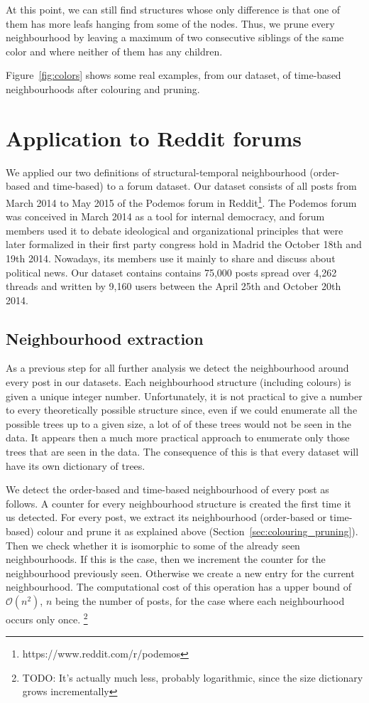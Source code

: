 \documentclass[conference]{IEEEtran}
\begin{document}
At this point, we can still find structures whose only difference is that one of them has more leafs hanging from some of the nodes. Thus, we prune every neighbourhood by leaving a maximum of two consecutive siblings of the same color and where neither of them has any children.

Figure~\ref{fig:colors} shows some real examples, from our dataset, of time-based neighbourhoods after colouring and pruning.

\section{Application to Reddit forums}
We applied our two definitions of structural-temporal neighbourhood (order-based and time-based) to a forum dataset. Our dataset consists of all posts from March 2014 to May 2015 of the Podemos forum in Reddit\footnote{https://www.reddit.com/r/podemos}. The Podemos forum was conceived in March 2014 as a tool for internal democracy, and forum members used it to debate ideological and organizational principles that were later formalized in their first party congress hold in Madrid the October 18th and 19th 2014. Nowadays, its members use it mainly to share and discuss about political news.
Our dataset contains contains 75,000 posts spread over 4,262 threads and written by 9,160 users between the April 25th and October 20th 2014.
\subsection{Neighbourhood extraction}
As a previous step for all further analysis we detect the neighbourhood around every post in our datasets. Each neighbourhood structure (including colours) is given a unique integer number. Unfortunately, it is not practical to give a number to every theoretically possible structure since, even if we could enumerate all the possible trees up to a given size, a lot of of these trees would not be seen in the data. It appears then a much more practical approach to enumerate only those trees that are seen in the data. The consequence of this is that every dataset will have its own dictionary of trees. 

We detect the order-based and time-based neighbourhood of every post as follows. A counter for every neighbourhood structure is created the first time it us detected. For every post, we extract its neighbourhood (order-based or time-based) colour and prune it as explained above (Section~\ref{sec:colouring_pruning}). Then we check whether it is isomorphic to some of the already seen neighbourhoods. If this is the case, then we increment the counter for the neighbourhood previously seen. Otherwise we create a new entry for the current neighbourhood. The computational cost of this operation has a upper bound of $\mathcal O(n^2)$, $n$ being the number of posts, for the case where each neighbourhood occurs only once. \footnote{TODO: It's actually much less, probably logarithmic, since the size dictionary grows incrementally}
\end{document}
